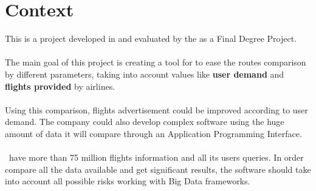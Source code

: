 
\chapter{Context}

\label{chapter01}

This is a project developed in \textit{\company} and evaluated by the \textit{\univname} as a Final Degree Project.
\\\\
The main goal of this project is creating a tool for \textit{\company} to ease the routes comparison by different parameters, taking into account values like \textbf{user demand} and \textbf{flights provided} by airlines.
\\\\
Using this comparison, flights advertisement could be improved according to user demand. The company could also develop complex software using the huge amount of data it will compare through an Application Programming Interface.
\\\\
\company\ have more than 75 million flights information and all its users queries. In order compare all the data available and get significant results, the software should take into account all possible risks working with Big Data frameworks.

\section{\company}

